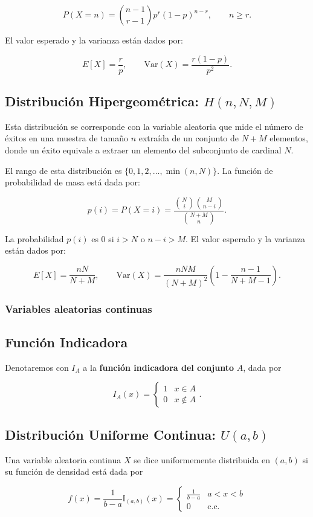 \documentclass[11pt, a4paper]{article}
\theoremstyle{definition}
\begin{document}
\[P(X=n)=\binom{n-1}{r-1}p^{r}(1-p)^{n-r},\qquad n\geq r.\]

El valor esperado y la varianza están dados por:

\[E[X]=\frac{r}{p},\qquad \text{Var}(X)=\frac{r(1-p)}{p^{2}}.\]

\subsection*{Distribución Hipergeométrica: $H(n,N,M)$}
Esta distribución se corresponde con la variable aleatoria que mide el número de éxitos en una muestra de tamaño $n$ extraída de un conjunto de $N+M$ elementos, donde un éxito equivale a extraer un elemento del subconjunto de cardinal $N$.

El rango de esta distribución es $\{0,1,2,\ldots,\min(n,N)\}$. La función de probabilidad de masa está dada por:

\[p(i)=P(X=i)=\frac{\binom{N}{i}\binom{M}{n-i}}{\binom{N+M}{n}}.\]

La probabilidad $p(i)$ es $0$ si $i>N$ o $n-i>M$. El valor esperado y la varianza están dados por:

\[E[X]=\frac{nN}{N+M},\qquad \text{Var}(X)=\frac{nNM}{(N+M)^{2}}\left(1-\frac{n-1}{N+M-1}\right).\]

\subsubsection{Variables aleatorias continuas}

\subsection*{Función Indicadora}
Denotaremos con $I_{A}$ a la \textbf{función indicadora del conjunto} $A$, dada por

\[I_{A}(x)=\begin{cases} 
1 & x\in A \\ 
0 & x\not\in A 
\end{cases}.\]

\subsection*{Distribución Uniforme Continua: $U(a,b)$}
Una variable aleatoria continua $X$ se dice uniformemente distribuida en $(a,b)$ si su función de densidad está dada por

\[f(x)=\frac{1}{b-a}\mathbb{I}_{(a,b)}(x)=\begin{cases}
\frac{1}{b-a} & a<x<b \\
0 & \text{c.c.}
\end{cases}\]
\end{document}
